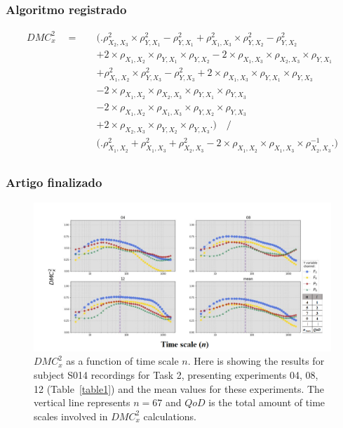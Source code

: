 \documentclass[11pt, aspectratio=169]{beamer}
\begin{document}
  \begin{frame}
    \frametitle{Algoritmo registrado}
  
    \begin{equation}
      \begin{split}
      DMC_{x}^{2} \quad = \quad & \Big( \Big. \rho^{2}_{X_{2},X_{3}} \times \rho^{2}_{Y,X_{1}}- \rho^{2}_{Y,X_{1}} + \rho^{2}_{X_{1},X_{3}}\times \rho^{2}_{Y,X_{2}}-\rho^{2}_{Y,X_{2}} \\
      &+ 2 \times \rho_{X_{1},X_{2}} \times \rho_{Y,X_{1}} \times \rho_{Y,X_{2}}   - 2 \times \rho_{X_{1},X_{3}} \times \rho_{X_{2},X_{3}} \times \rho_{Y,X_{1}} \\
      &+ \rho^{2}_{X_{1},X_{2}} \times \rho^{2}_{Y,X_{3}}-\rho^{2}_{Y,X_{3}} + 2 \times \rho_{X_{1},X_{3}} \times \rho_{Y,X_{1}} \times \rho_{Y,X_{3}} \\ 
      &- 2 \times \rho_{X_{1},X_{2}} \times \rho_{X_{2},X_{3}} \times \rho_{Y,X_{1}} \times \rho_{Y,X_{3}} \\
      &- 2 \times \rho_{X_{1},X_{2}} \times \rho_{X_{1},X_{3}} \times \rho_{Y,X_{2}} \times \rho_{Y,X_{3}} \\
      &+ 2 \times \rho_{X_{2},X_{3}} \times \rho_{Y,X_{2}} \times \rho_{Y,X_{3}} \Big. \Big)    \quad \Big/ \\
      & \Big( \Big. \rho^{2}_{X_{1},X_{2}} + \rho^{2}_{X_{1},X_{3}} + \rho^{2}_{X_{2},X_{3}} - 2 \times \rho_{X_{1},X_{2}} \times \rho_{X_{1},X_{3}} \times \rho_{X_{2},X_{3}}^{-1}\Big. \Big)  \\
      \end{split}
      \label{eq:dmc_3x_y} 
      \end{equation}
  
  \end{frame}
  

  \begin{frame}
    \frametitle{Artigo finalizado}
  
    \begin{figure}[!h]
      \includegraphics[height=.5\paperheight]{../Figures/art_02/Fig2.png}
      \caption{$DMC_{x}^{2}$ as a function of time scale $n$. Here is showing the results for subject S014 recordings for Task 2, presenting experiments 04, 08, 12 (Table~\ref{table1}) and the mean values for these experiments. The vertical line represents $n=67$ and $QoD$ is the total amount of time scales involved in $DMC_{x}^{2}$ calculations.}
      \label{fig02}
    \end{figure}
  \end{frame}
\end{document}
